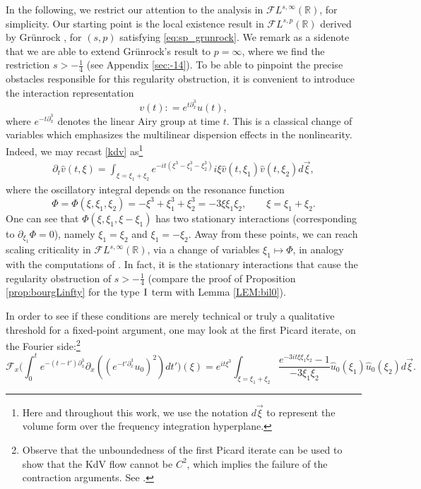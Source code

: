 \documentclass[a4paper,
11pt,  reqno]{amsart}
\newcommand{\I}{\hspace{0.2mm}\textup{I}\hspace{0.2mm}}
\newcommand{\5}{\textup{V}}
\newcommand{\FL}{\mathcal{F} L}
\newcommand{\dx}{\partial_x}
\newcommand{\dt}{\partial_t}
\theoremstyle{remark}
\newcommand{\R}{\mathbb{R}}
\newcommand{\Ft}{{\mathcal{F}}}
\numberwithin{equation}{section}
\numberwithin{theorem}{section}
\begin{document}
In the following, we restrict our attention to the analysis in $\FL^{s,\infty}(\R)$, for simplicity.
	Our starting point is the local existence result in $\mathcal{F}L^{s,p}(\R)$ derived by Grünrock \cite{Grunrock_ldv_hier}, for $(s,p)$ satisfying \eqref{eq:sp_grunrock}. We remark as a sidenote that we are able to extend Grünrock's result to $p=\infty$, where we find the restriction $s>-\frac14$ (see Appendix \ref{sec:-14}).
	To be able to pinpoint the precise obstacles responsible for this regularity obstruction,  it is convenient to introduce the interaction representation \cite{Ginibre_interaction_rep}
	\begin{equation}\label{inter}
		v(t) : = e^{t\partial_x^3}u(t),
	\end{equation}
	where $e^{-t\dx^3}$ denotes the linear Airy group at time $t$.
This is a classical change of variables which emphasizes the multilinear dispersion effects in the nonlinearity.
Indeed, we may recast \eqref{kdv} as\footnote{Here and throughout this work, we use the notation $d\vec{\xi}$ to represent the volume form over the frequency integration hyperplane.}
	\begin{align}
		\label{dtv}
		\dt{\widehat{v}}(t,\xi) = \int_{\xi = \xi_1+\xi_2} e^{-it (\xi^3 -\xi_1^3 -
			\xi^3_2)} i \xi \widehat{v}(t,\xi_1) \widehat{v}(t,\xi_2)  d\vec{\xi}
		,
	\end{align}
where the oscillatory integral depends on the resonance function
	\begin{equation}\label{phase-intro}
		\Phi = \Phi(\xi,\xi_1,\xi_2)=-\xi^3+\xi_1^3+\xi_2^3 = -3\xi\xi_1\xi_2, \qquad \xi=\xi_1+\xi_2.
	\end{equation}
One can see that $\Phi(\xi, \xi_1, \xi-\xi_1)$ has two stationary interactions
(corresponding to $\partial_{\xi_1}\Phi=0$), namely $\xi_1=\xi_2$ and $\xi_1=-\xi_2$. Away from these points, we can reach scaling criticality in $\FL^{s,\infty}(\R)$, via a change of variables $\xi_1\mapsto \Phi$, in analogy with the computations of \cite{kpv_bilin}.
In fact, it is the stationary interactions that cause the regularity obstruction of $s>-\frac14$ (compare the proof of Proposition \ref{prop:bourgLinfty} for the type $\I$ term with Lemma \ref{LEM:bil0}).



	\medskip
	In order to see if these conditions are merely technical or truly a qualitative threshold for a fixed-point argument, one may look at the {first Picard iterate}, on the Fourier side:\footnote{Observe that the unboundedness of the first Picard iterate can be used to show that the KdV flow cannot be $C^2$, which implies the failure of the contraction arguments. See  \cite{bou_ill_kdv, MolTzeSaut_ill, Tzvetkov_ill}.}
	\begin{equation}\label{picard1}
\Ft_x\bigg(
	\int_0^t e^{-(t-t')\dx^3}\partial_x((e^{-t'\dx^3}u_0)^2)dt'
\bigg) (\xi)
=
e^{it \xi^3}
\int_{\xi=\xi_1+\xi_2}\frac{e^{-3it\xi\xi_1\xi_2}-1}{-3\xi_1\xi_2} \widehat{u}_0( \xi_1) \widehat{u}_0(\xi_2) d\vec{\xi}.
\end{equation}
\end{document}
